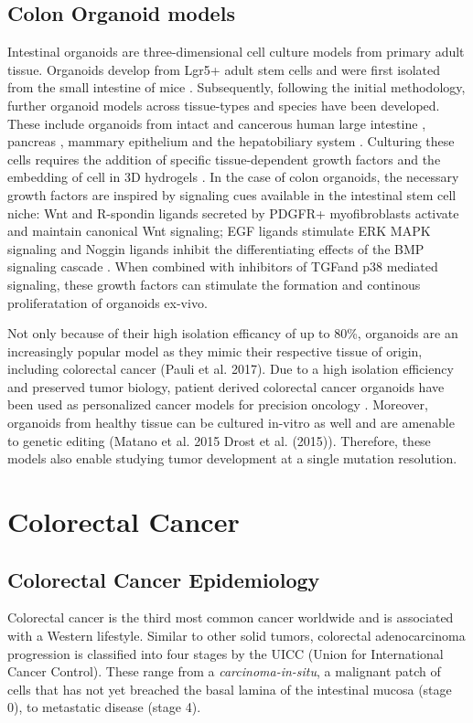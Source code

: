 \begin{flushleft}
\subsection{Colon Organoid models}
Intestinal organoids are three-dimensional cell culture models from primary adult tissue. Organoids develop from Lgr5+ adult stem cells and were first isolated from the small intestine of mice \cite{Sato2011}. Subsequently, following the initial methodology, further organoid models across tissue-types and species have been developed. These include organoids from intact and cancerous human large intestine \cite{Sato2011}, pancreas \cite{Sachs2017}, mammary epithelium \cite{Zhang2016EstablishingCells, Sachs2017AHeterogeneity}and the hepatobiliary system \cite{Huch2013NIHAccess, Broutier2016CultureManipulation.}.
Culturing these cells requires the addition of specific tissue-dependent growth factors and the embedding of cell in 3D hydrogels \cite{Merker2016GastrointestinalOut}. In the case of colon organoids, the necessary growth factors are inspired by signaling cues available in the intestinal stem cell niche: Wnt and R-spondin ligands secreted by PDGFR+ myofibroblasts activate and maintain canonical Wnt signaling; EGF ligands stimulate ERK MAPK signaling and Noggin ligands inhibit the differentiating effects of the BMP signaling cascade \cite{Sato2013}. When combined with inhibitors of TGF\textbeta and p38 mediated signaling, these growth factors can stimulate the formation and continous proliferatation of organoids ex-vivo. 

Not only because of their high isolation efficancy of up to 80\%, organoids are an increasingly popular model as they mimic their respective tissue of origin, including colorectal cancer (Pauli et al. 2017). Due to a high isolation efficiency and preserved tumor biology, patient derived colorectal cancer organoids have been used as personalized cancer models for precision oncology \cite{VanDeWetering2015, Vlachogiannis2018}. Moreover, organoids from healthy tissue can be cultured in-vitro as well and are amenable to genetic editing (Matano et al. 2015 Drost et al. (2015)). Therefore, these models also enable studying tumor development at a single mutation resolution.

\section{Colorectal Cancer}
\subsection{Colorectal Cancer Epidemiology}
Colorectal cancer is the third most common cancer worldwide and is associated with a Western lifestyle. Similar to other solid tumors, colorectal adenocarcinoma progression is classified into four stages by the UICC (Union for International Cancer Control). These range from a \textit{carcinoma-in-situ}, a malignant patch of cells that has not yet breached the basal lamina of the intestinal mucosa (stage 0), to metastatic disease (stage 4).\par



\end{flushleft}
